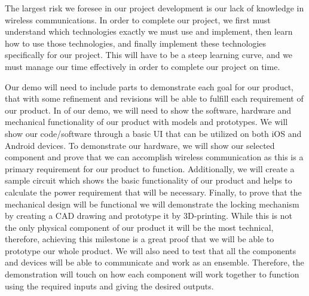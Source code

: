 \documentclass{article}
\begin{document}
The largest risk we foresee in our project development is our lack of knowledge in wireless communications. In order to complete our project, we first must understand which technologies exactly we must use and implement, then learn how to use those technologies, and finally implement these technologies specifically for our project.  This will have to be a steep learning curve, and we must manage our time effectively in order to complete our project on time. 

Our demo will need to include parts to demonstrate each goal for our product, that with some refinement and revisions will be able to fulfill each requirement of our product. In of our demo, we will need to show the software, hardware and mechanical functionality of our product with models and prototypes.  We will show our code/software through a basic UI that can be utilized on both iOS and Android devices.  To demonstrate our hardware, we will show our selected component and prove that we can accomplish wireless communication as this is a primary requirement for our product to function.  Additionally, we will create a sample circuit which shows the basic functionality of our product and helps to calculate the power requirement that will be necessary.  Finally, to prove that the mechanical design will be functional we will demonstrate the locking mechanism by creating a CAD drawing and prototype it by 3D-printing.  While this is not the only physical component of our product it will be the most technical, therefore, achieving this milestone is a great proof that we will be able to prototype our whole product.  We will also need to test that all the components and devices will be able to communicate and work as an ensemble.  Therefore, the demonstration will touch on how each component will work together to function using the required inputs and giving the desired outputs.



\end{document}

